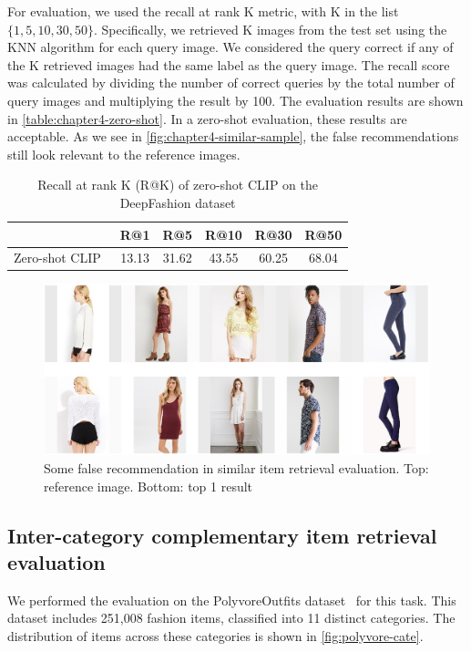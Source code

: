 For evaluation, we used the recall at rank K metric, with K in the list $\{1, 5, 10, 30, 50\}$.
Specifically, we retrieved K images from the test set using the KNN algorithm for each query image. 
We considered the query correct if any of the K retrieved images had the same label as the query image.
The recall score was calculated by dividing the number of correct queries by the total number of query images and multiplying the result by 100.
The evaluation results are shown in \autoref{table:chapter4-zero-shot}.
In a zero-shot evaluation, these results are acceptable.
As we see in \autoref{fig:chapter4-similar-sample}, the false recommendations still look relevant to the reference images. 

\begin{table}[h!]
\centering
\begin{tabular}{l c c c c c}
\hline
& R@1  & R@5 & R@10 & R@30  & R@50         \\ \hline
Zero-shot CLIP~\cite{Baldrati-CVPR2022-Conditioned}  & 13.13  & 31.62 & 43.55 & 60.25  & 68.04           \\ \hline
\end{tabular}
\caption{Recall at rank K (R@K) of zero-shot CLIP on the DeepFashion dataset}
\label{table:chapter4-zero-shot}
\end{table}

\begin{figure}[h!]
    \centering
    \includegraphics[width=0.75\linewidth]{content/resources/images/fashion-recommendation/chapter4-similar-sample.PNG}
    \caption{Some false recommendation in similar item retrieval evaluation. Top: reference image. Bottom: top 1 result}
    \label{fig:chapter4-similar-sample}
\end{figure}

\subsection{Inter-category complementary item retrieval evaluation}
We performed the evaluation on the PolyvoreOutfits dataset~\cite{Mariya-ECCV18-Learning} for this task.
This dataset includes 251,008 fashion items, classified into 11 distinct categories.
The distribution of items across these categories is shown in \autoref{fig:polyvore-cate}.

